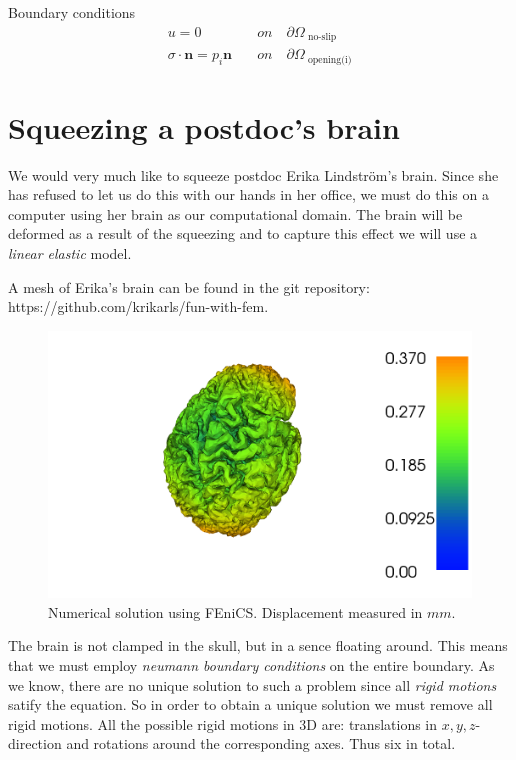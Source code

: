 \documentclass[epsfig,11pt]{article}
\begin{document}
Boundary conditions
\begin{align*}
u = 0 \quad &on \quad \partial \Omega_{\text{ no-slip}} \\
\sigma \cdot \mathbf{n} = p_i\mathbf{n} \quad &on \quad \partial \Omega_\text{ opening(i)}
\end{align*}

\section{Squeezing a postdoc's brain}

We would very much like to squeeze postdoc Erika Lindström's brain. Since she has refused to let us do this with our hands in her office, we must do this on a computer using her brain as our computational domain. The brain will be deformed as a result of the squeezing and to capture this effect we will use a \emph{linear elastic} model. 

A mesh of Erika's brain can be found in the git repository:
 https://github.com/krikarls/fun-with-fem. 
 
 \begin{figure}[h!] 
\begin{center}
  \includegraphics[scale=0.4]{brain.png}
  \end{center}
  \caption{Numerical solution using FEniCS. Displacement measured in $mm$.}
\end{figure}

The brain is not clamped in the skull, but in a sence floating around. This means that we must employ \emph{neumann boundary conditions} on the entire boundary. As we know, there are no unique solution to such a problem since all \emph{rigid motions} satify the equation. So in order to obtain a unique solution we must remove all rigid motions. All the possible rigid motions in 3D are: translations in $x,y,z$-direction and rotations around the corresponding axes. Thus six in total.
\end{document}
